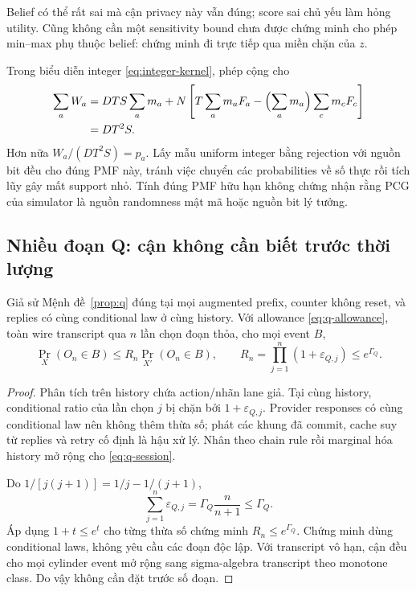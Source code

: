 Belief có thể rất sai mà cận privacy này vẫn đúng; score sai chủ yếu làm hỏng utility. Cũng không
cần một sensitivity bound chưa được chứng minh cho phép min--max phụ thuộc belief: chứng minh
đi trực tiếp qua miền chặn của $z$.

Trong biểu diễn integer \eqref{eq:integer-kernel}, phép cộng cho
\begin{align}
\sum_aW_a
&=DT S\sum_a m_a
+N\left[T\sum_a m_aF_a-\Bigl(\sum_a m_a\Bigr)\sum_c m_cF_c\right]\nonumber\\
&=DT^2S.
\label{eq:integer-sum}
\end{align}
Hơn nữa $W_a/(DT^2S)=p_a$. Lấy mẫu uniform integer bằng rejection với nguồn bit đều cho đúng PMF
này, tránh việc chuyển các probabilities về số thực rồi tích lũy gây mất support nhỏ. Tính đúng
PMF hữu hạn không chứng nhận rằng PCG của simulator là nguồn randomness mật mã hoặc nguồn bit lý tưởng.

\subsection{Nhiều đoạn Q: cận không cần biết trước thời lượng}
\begin{proposition}\label{prop:segments}
Giả sử Mệnh đề~\ref{prop:q} đúng tại mọi augmented prefix, counter không reset, và replies có cùng
conditional law ở cùng history. Với allowance \eqref{eq:q-allowance}, toàn wire transcript qua
$n$ lần chọn đoạn thỏa, cho mọi event $B$,
\begin{equation}
\Pr_X(O_n\in B)\le R_n\Pr_{X'}(O_n\in B),\qquad
R_n=\prod_{j=1}^n(1+\varepsilon_{Q,j})\le e^{\Gamma_Q}.
\label{eq:q-session}
\end{equation}
\end{proposition}
\begin{proof}
Phân tích trên history chứa action/nhãn lane giả. Tại cùng history, conditional ratio của lần chọn
$j$ bị chặn bởi $1+\varepsilon_{Q,j}$. Provider responses có cùng conditional law nên không thêm
thừa số; phát các khung đã commit, cache suy từ replies và retry cố định là hậu xử lý. Nhân theo
chain rule rồi marginal hóa history mở rộng cho \eqref{eq:q-session}.

Do $1/[j(j+1)]=1/j-1/(j+1)$,
\begin{equation}
\sum_{j=1}^n\varepsilon_{Q,j}=\Gamma_Q\frac{n}{n+1}\le\Gamma_Q.
\label{eq:q-telescoping}
\end{equation}
Áp dụng $1+t\le e^t$ cho từng thừa số chứng minh $R_n\le e^{\Gamma_Q}$. Chứng minh dùng conditional
laws, không yêu cầu các đoạn độc lập. Với transcript vô hạn, cận đều cho mọi cylinder event mở rộng
sang sigma-algebra transcript theo monotone class. Do vậy không cần đặt trước số đoạn.
\end{proof}

